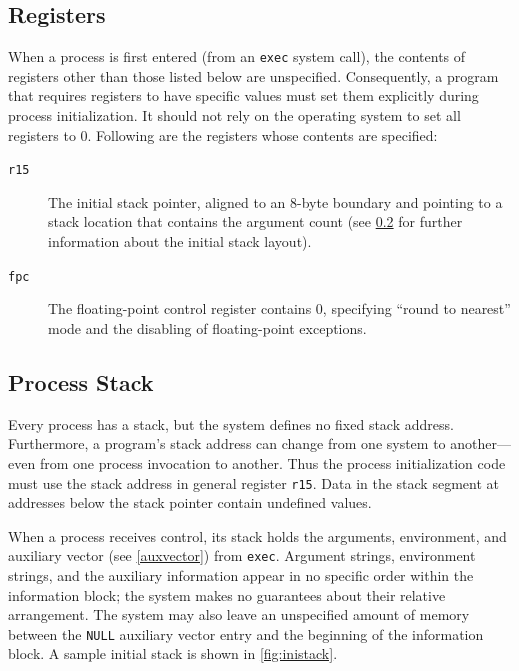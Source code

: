 \documentclass[USenglish,fontsize=11pt,twoside,%
  toc=bib,toc=idx,toc=graduated,numbers=noendperiod,
  bookmarks=true,
  bookmarksnumbered=true,
  bookmarksopen=true,
  bookmarksopenlevel=1,
  breaklinks=true,
  colorlinks=true,
  linkcolor=black,
  pdfpagelayout={TwoPageRight},
  pdfusetitle=true
]{scrreprt}
\begin{document}
\subsection{Registers}
When a process is first entered (from an \texttt{exec} system call),
the contents of registers other than those listed below are
unspecified.  Consequently, a program that requires registers to have
specific values must set them explicitly during process
initialization.  It should not rely on the operating system to set all
registers to 0.  Following are the registers whose contents are
specified:
\begin{description}
\item[\texttt{r15}] The initial stack pointer, aligned to an 8-byte
  boundary and pointing to a stack location that contains the
  argument count (see \cref{processstack} for further
  information about the initial stack layout).
\item[\texttt{fpc}] The floating-point control register contains 0,
  specifying ``round to nearest'' mode and the disabling of
  floating-point exceptions.
\end{description}

\subsection{Process Stack}
\label{processstack}
Every process has a stack, but the system defines no fixed stack
address.  Furthermore, a program's stack address can change from one
system to another---even from one process invocation to another.
Thus the process initialization code must use the stack address in
general register \texttt{r15}.  Data in the stack segment at
addresses below the stack pointer contain undefined values.

When a process receives control, its stack holds the arguments,
environment, and auxiliary vector (see \cref{auxvector}) from
\texttt{exec}.  Argument strings, environment strings, and the auxiliary
information appear in no specific order within the information block; the
system makes no guarantees about their relative arrangement.  The system
may also leave an unspecified amount of memory between the \texttt{NULL}
auxiliary vector entry and the beginning of the information block.  A
sample initial stack is shown in \cref{fig:inistack}.
\end{document}
